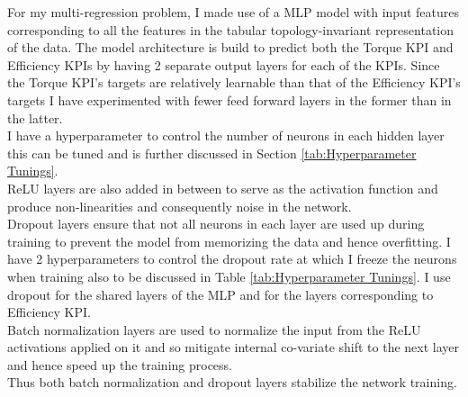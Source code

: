 \documentclass{report} %
\begin{document}
For my multi-regression problem, I made use of a \ac{MLP} model with input features corresponding to all the features in the tabular topology-invariant representation of 
the data. The model architecture is build to predict both the Torque \ac{KPI} and Efficiency \ac{KPI}s by having 2 separate output layers for each of the \ac{KPI}s. 
Since the Torque \ac{KPI}'s targets are relatively learnable than that of the Efficiency \ac{KPI}'s targets I have experimented with fewer feed forward layers in the former than in the latter. \\
I have a hyperparameter to control the number of neurons in each hidden layer this can be tuned and is further discussed in Section \ref{tab:Hyperparameter Tunings}.\\
\ac{ReLU} layers are also added in between to serve as the activation function and produce non-linearities and consequently noise in the network. \\
Dropout layers ensure that not all neurons in each layer are used up during training to prevent the model from memorizing the data and hence overfitting.  
I have 2 hyperparameters to control the dropout rate at which I freeze the neurons when training also to be discussed in Table \ref{tab:Hyperparameter Tunings}.
I use dropout for the shared layers of the \ac{MLP} and for the layers corresponding to Efficiency \ac{KPI}.\\
Batch normalization layers are used to normalize the input from the \ac{ReLU} activations applied on it and so mitigate internal co-variate shift to the next layer and hence speed up the training process.\\
Thus both batch normalization and dropout layers stabilize the network training.\\
\end{document}
